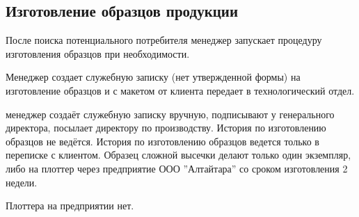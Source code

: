 \newpage
\subsection{Изготовление образцов продукции}
\label{bp:pattern}





После поиска потенциального потребителя менеджер запускает процедуру изготовления образцов при необходимости.

Менеджер создает служебную записку (нет утвержденной формы) на изготовление образцов и с макетом от клиента передает в технологический отдел. 

 менеджер создаёт служебную записку вручную, подписывают у генерального директора, посылает директору по производству. История по изготовлению образцов не ведётся. История по изготовлению образцов ведется только в переписке с клиентом. 
 Образец сложной высечки делают только один экземпляр, либо на плоттер через предприятие ООО ''Алтайтара'' со сроком изготовления 2 недели.
 
 Плоттера на предприятии нет.
 


